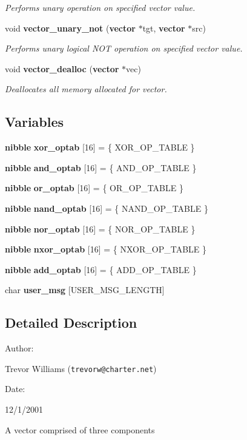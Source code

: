 \begin{CompactItemize}
\begin{CompactList}\small\item\em Performs unary operation on specified vector value.\item\end{CompactList}\item 
void {\bf vector\_\-unary\_\-not} ({\bf vector} $\ast$tgt, {\bf vector} $\ast$src)
\begin{CompactList}\small\item\em Performs unary logical NOT operation on specified vector value.\item\end{CompactList}\item 
void {\bf vector\_\-dealloc} ({\bf vector} $\ast$vec)
\begin{CompactList}\small\item\em Deallocates all memory allocated for vector.\item\end{CompactList}\end{CompactItemize}
\subsection*{Variables}
\begin{CompactItemize}
\item 
{\bf nibble} {\bf xor\_\-optab} [16] = \{ XOR\_\-OP\_\-TABLE \}
\item 
{\bf nibble} {\bf and\_\-optab} [16] = \{ AND\_\-OP\_\-TABLE \}
\item 
{\bf nibble} {\bf or\_\-optab} [16] = \{ OR\_\-OP\_\-TABLE \}
\item 
{\bf nibble} {\bf nand\_\-optab} [16] = \{ NAND\_\-OP\_\-TABLE \}
\item 
{\bf nibble} {\bf nor\_\-optab} [16] = \{ NOR\_\-OP\_\-TABLE \}
\item 
{\bf nibble} {\bf nxor\_\-optab} [16] = \{ NXOR\_\-OP\_\-TABLE \}
\item 
{\bf nibble} {\bf add\_\-optab} [16] = \{ ADD\_\-OP\_\-TABLE \}
\item 
char {\bf user\_\-msg} [USER\_\-MSG\_\-LENGTH]
\end{CompactItemize}


\subsection{Detailed Description}


\begin{Desc}
\item[Author: ]\par
Trevor Williams ({\tt trevorw@charter.net}) \end{Desc}
\begin{Desc}
\item[Date: ]\par
12/1/2001

 A vector comprised of three components\end{Desc}


